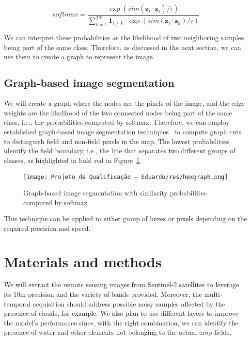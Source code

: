 \documentclass[12pt]{article}
\begin{document}
\begin{equation}
softmax=\frac{\exp{\left(sim(\boldsymbol{z}_i\cdot\boldsymbol{z}_j)/\tau\right)}}{\sum_{k=1}^{2N}\mathbf{1}_{i\neq k}\cdot\exp{\left(sim(\boldsymbol{z}_i\cdot\boldsymbol{z}_k)/\tau\right)}}
\label{eqn:softmax}
\end{equation}

We can interpret these probabilities as the likelihood of two neighboring samples being part of the same class. Therefore, as discussed in the next section, we can use them to create a graph to represent the image.

\subsection{Graph-based image segmentation}\label{subsection:graphbasedsegmentation}

We will create a graph where the nodes are the pixels of the image, and the edge weights are the likelihood of the two connected nodes being part of the same class, i.e., the probabilities computed by softmax. Therefore, we can employ established graph-based image segmentation techniques~\citep{felzenszwalb2004} to compute graph cuts~\citep{veksler2001} to distinguish field and non-field pixels in the map. The lowest probabilities identify the field boundary, i.e., the line that separates two different groups of classes, as highlighted in bold red in Figure~\ref{figure:hexgraph}.


\begin{figure}[ht]
\centering
\texttt{[image: Projeto de Qualificação - Eduardo/res/hexgraph.png]}
\caption{\label{figure:hexgraph}Graph-based image segmentation with similarity probabilities computed by softmax\protect}
\end{figure}

This technique can be applied to either group of hexes or pixels depending on the required precision and speed.


\section{Materials and methods}\label{section:materiais}

We will extract the remote sensing images from Sentinel-2 satellites to leverage its 10m precision and the variety of bands provided. Moreover, the multi-temporal acquisition should address possible noisy samples affected by the presence of clouds, for example. We also plan to use different layers to improve the model's performance since, with the right combination, we can identify the presence of water and other elements not belonging to the actual crop fields.
\end{document}
